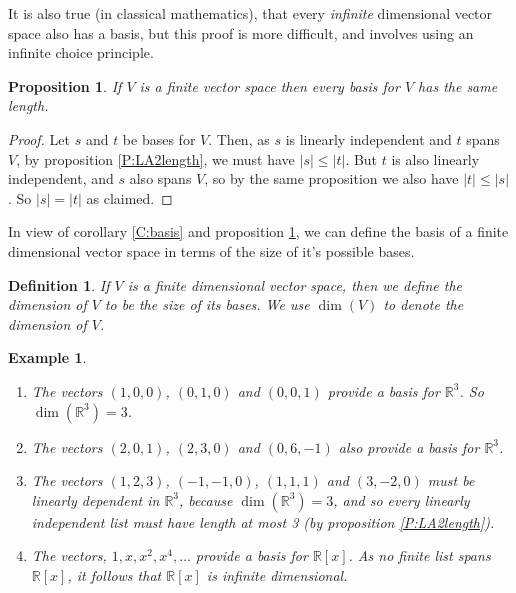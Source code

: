 \documentclass{article}
\theoremstyle{plain}
\newtheorem{proposition}[theorem]{Proposition}{\bfseries}{\itshape}
\newtheorem{definition}[theorem]{Definition}{\bfseries}{\upshape}
\newtheorem{example}[theorem]{Example}{\bfseries}{\upshape}
\newcommand{\bR}{\mathbb{R}}
\begin{document}
It is also true (in classical mathematics), that every \emph{infinite} dimensional vector space also has a basis, but this proof is more difficult, and involves using an infinite choice principle. 

\begin{proposition}\label{P:LA2basis}
If $V$ is a finite vector space then every basis for $V$ has the same length.
\end{proposition}
\begin{proof}
Let $s$ and $t$ be bases for $V$. Then, as $s$ is linearly independent and $t$ spans $V$, by proposition \ref{P:LA2length}, we must have $|s|\leq |t|$. But $t$ is also linearly independent, and $s$ also spans $V$, so by the same proposition we also have $|t|\leq |s|$. So $|s|=|t|$ as claimed.
\end{proof}

In view of corollary \ref{C:basis} and proposition \ref{P:LA2basis}, we can define the basis of a finite dimensional vector space in terms of the size of it's possible bases.
\begin{definition}
If $V$ is a finite dimensional vector space, then we define the \emph{dimension} of $V$ to be the size of its bases. We use $\dim(V)$ to denote the dimension of $V$.
\end{definition}

\begin{example}\mbox{}
\begin{enumerate}
\item The vectors $(1,0,0)$, $(0,1,0)$ and $(0,0,1)$ provide a basis for $\bR^3$. So $\dim(\bR^3) = 3$.
\item The vectors $(2,0,1)$, $(2,3,0)$ and $(0,6,-1)$ also provide a basis for $\bR^3$.
\item The vectors $(1,2,3)$, $(-1,-1,0)$, $(1,1,1)$ and $(3,-2,0)$ must be linearly dependent in $\bR^3$, because $\dim(\bR^3) = 3$, and so every linearly independent list must have length at most 3 (by proposition \ref{P:LA2length}). 
\item The vectors, $1,x,x^2,x^4,\ldots$ provide a basis for $\bR[x]$. As no finite list spans $\bR[x]$, it follows that $\bR[x]$ is infinite dimensional.  
\end{enumerate}
\end{example}
\end{document}
